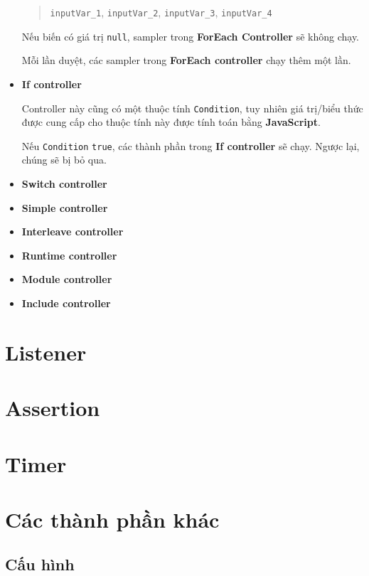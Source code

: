 \documentclass[10pt]{report}
\begin{document}
\begin{itemize}[itemsep=0pt]
        \begin{quotation}
            \texttt{inputVar\_1}, \texttt{inputVar\_2}, \texttt{inputVar\_3}, \texttt{inputVar\_4}
        \end{quotation}
        \par Nếu biến có giá trị \texttt{null}, sampler trong \textbf{ForEach Controller} sẽ không chạy.
        \par Mỗi lần duyệt, các sampler trong \textbf{ForEach controller} chạy thêm một lần.
    \item \textbf{If controller}
        \par Controller này cũng có một thuộc tính \texttt{Condition}, tuy nhiên giá trị/biểu thức được cung cấp cho thuộc tính này được tính toán bằng \textbf{JavaScript}.
        \par Nếu \texttt{Condition} \texttt{true}, các thành phần trong \textbf{If controller} sẽ chạy. Ngược lại, chúng sẽ bị bỏ qua.
    \item \textbf{Switch controller}
    \item \textbf{Simple controller}
    \item \textbf{Interleave controller}
    \item \textbf{Runtime controller}
    \item \textbf{Module controller}
    \item \textbf{Include controller}
\end{itemize}

\section{Listener}

\section{Assertion}

\section{Timer}

\section{Các thành phần khác}

\subsection{Cấu hình}
\end{document}
